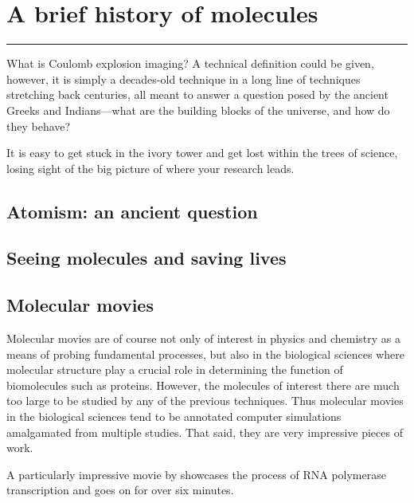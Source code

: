 \chapter{A brief history of molecules}\label{ch:history}

\vspace{-1.5 em}
\begin{addmargin}[-0.5cm]{0cm}
  \minitoc
\end{addmargin}
\hrule
\vspace{1.5 em}

What is Coulomb explosion imaging? A technical definition could be given, however, it is simply a decades-old technique in a long line of techniques stretching back centuries, all meant to answer a question posed by the ancient Greeks and Indians---what are the building blocks of the universe, and how do they behave?

It is easy to get stuck in the ivory tower and get lost within the trees of science, losing sight of the big picture of where your research leads.

\section{Atomism: an ancient question}

\section{Seeing molecules and saving lives}

\section{Molecular movies}
Molecular movies are of course not only of interest in physics and chemistry as a means of probing fundamental processes, but also in the biological sciences where molecular structure play a crucial role in determining the function of biomolecules such as proteins. However, the molecules of interest there are much too large to be studied by any of the previous techniques. Thus molecular movies in the biological sciences tend to be annotated computer simulations amalgamated from multiple studies. That said, they are very impressive pieces of work.

A particularly impressive movie by \citet{Cheung12} showcases the process of RNA polymerase transcription and goes on for over six minutes.

